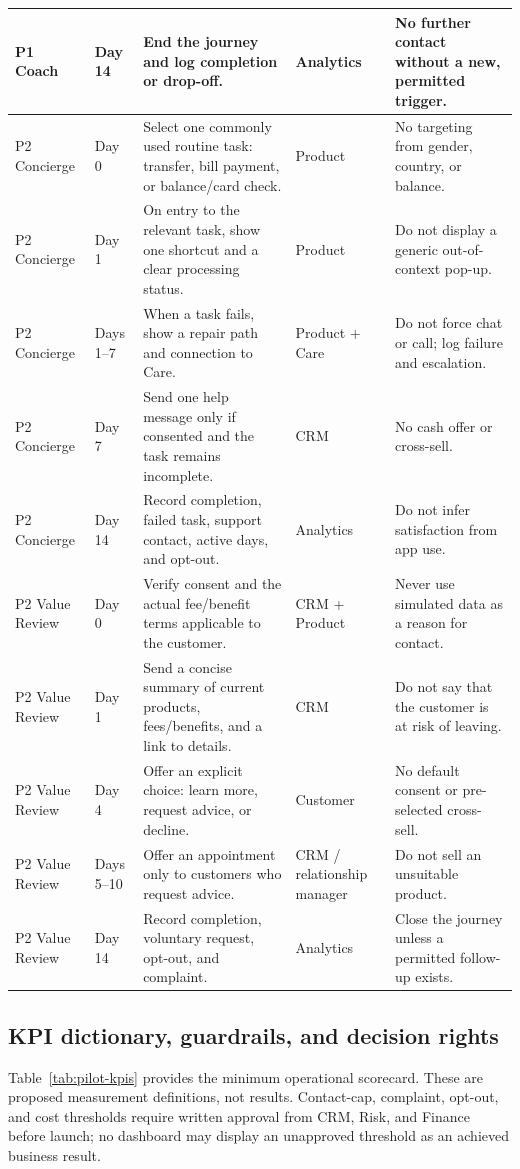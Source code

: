 \documentclass[a4paper,12pt]{article}
\begin{document}
\begin{longtable}{P{0.13\textwidth}P{0.16\textwidth}P{0.36\textwidth}P{0.16\textwidth}Y}
P1 Coach & Day 14 & End the journey and log completion or drop-off. & Analytics & No further contact without a new, permitted trigger.\\
\midrule
P2 Concierge & Day 0 & Select one commonly used routine task: transfer, bill payment, or balance/card check. & Product & No targeting from gender, country, or balance.\\
P2 Concierge & Day 1 & On entry to the relevant task, show one shortcut and a clear processing status. & Product & Do not display a generic out-of-context pop-up.\\
P2 Concierge & Days 1--7 & When a task fails, show a repair path and connection to Care. & Product + Care & Do not force chat or call; log failure and escalation.\\
P2 Concierge & Day 7 & Send one help message only if consented and the task remains incomplete. & CRM & No cash offer or cross-sell.\\
P2 Concierge & Day 14 & Record completion, failed task, support contact, active days, and opt-out. & Analytics & Do not infer satisfaction from app use.\\
\midrule
P2 Value Review & Day 0 & Verify consent and the actual fee/benefit terms applicable to the customer. & CRM + Product & Never use simulated data as a reason for contact.\\
P2 Value Review & Day 1 & Send a concise summary of current products, fees/benefits, and a link to details. & CRM & Do not say that the customer is at risk of leaving.\\
P2 Value Review & Day 4 & Offer an explicit choice: learn more, request advice, or decline. & Customer & No default consent or pre-selected cross-sell.\\
P2 Value Review & Days 5--10 & Offer an appointment only to customers who request advice. & CRM / relationship manager & Do not sell an unsuitable product.\\
P2 Value Review & Day 14 & Record completion, voluntary request, opt-out, and complaint. & Analytics & Close the journey unless a permitted follow-up exists.\\
\end{longtable}

\subsection{KPI dictionary, guardrails, and decision rights}

Table~\ref{tab:pilot-kpis} provides the minimum operational scorecard. These are proposed measurement definitions, not results. Contact-cap, complaint, opt-out, and cost thresholds require written approval from CRM, Risk, and Finance before launch; no dashboard may display an unapproved threshold as an achieved business result.
\end{document}
